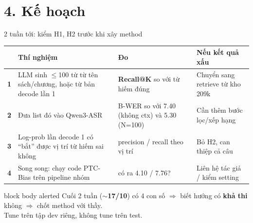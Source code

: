 \documentclass[aspectratio=169,xcolor=table]{beamer}
\newcommand{\hi}[1]{\textcolor{Primary}{\textbf{#1}}}
\begin{document}
\section{4. Kế hoạch}
\begin{frame}{2 tuần tới: kiểm H1, H2 trước khi xây method}
\footnotesize\renewcommand{\arraystretch}{1.3}
\begin{tabular}{@{}p{0.4cm}p{4.1cm}p{3.6cm}p{4.3cm}@{}}
\toprule
& \textbf{Thí nghiệm} & \textbf{Đo} & \textbf{Nếu kết quả xấu}\\
\midrule
\hi{1} & LLM sinh $\le$100 từ từ tên sách/chương, hoặc từ bản decode lần 1 & \textbf{Recall@K} so với từ hiếm đúng & Chuyển sang retrieve từ kho 209k\\
\hi{2} & Đưa list đó vào Qwen3-ASR & B-WER so với 7.40 (không ctx) và 5.30 (N=100) & Cần thêm bước lọc/xếp hạng\\
\hi{3} & Log-prob lần decode 1 có ``bắt'' được vị trí từ hiếm sai không & precision / recall theo vị trí & Bỏ H2, can thiệp cả câu\\
\hi{4} & Song song: chạy code PTC-Bias trên pipeline nhóm & có ra 4.10 / 7.76? & Liên hệ tác giả / kiểm setting\\
\bottomrule
\end{tabular}
\vspace{0.3cm}
\begin{beamercolorbox}[sep=0.5em,center,rounded=true]{block body alerted}
\small Cuối 2 tuần (\textbf{$\sim$17/10}) có 4 con số $\Rightarrow$ biết hướng có \textbf{khả thi} không $\Rightarrow$ chốt method với thầy.\\
Tune trên tập dev riêng, không tune trên test.
\end{beamercolorbox}
\end{frame}
\end{document}
